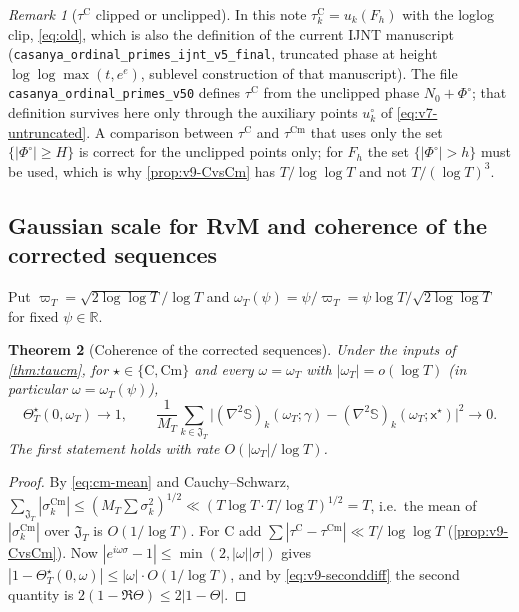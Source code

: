 \documentclass[11pt,a4paper]{article}
\numberwithin{equation}{section}
\newtheorem{theorem}{Theorem}[section]
\theoremstyle{definition}
\theoremstyle{remark}
\newtheorem{remark}[theorem]{Remark}
\newcommand{\Cm}{\mathrm{Cm}}
\begin{document}
\begin{remark}[$\tau^{\mathrm C}$ clipped or unclipped]\label{rem:v9-clip}
In this note $\tau_k^{\mathrm C}=u_k(F_h)$ with the loglog clip, \eqref{eq:old}, which is also the definition of the current IJNT manuscript (\texttt{casanya\_\allowbreak ordinal\_\allowbreak primes\_\allowbreak ijnt\_\allowbreak v5\_\allowbreak final}, truncated phase at height $\log\log\max(t,e^e)$, sublevel construction of that manuscript). The file \texttt{casanya\_ordinal\_primes\_v50} defines $\tau^{\mathrm C}$ from the unclipped phase $N_0+\Phi^\circ$; that definition survives here only through the auxiliary points $u_k^\circ$ of \eqref{eq:v7-untruncated}. A comparison between $\tau^{\mathrm C}$ and $\tau^{\Cm}$ that uses only the set $\{|\Phi^\circ|\ge H\}$ is correct for the unclipped points only; for $F_h$ the set $\{|\Phi^\circ|>h\}$ must be used, which is why \cref{prop:v9-CvsCm} has $T/\log\log T$ and not $T/(\log T)^3$.
\end{remark}

\subsection{Gaussian scale for RvM and coherence of the corrected sequences}\label{sec:v9-coherence}
Put $\varpi_T=\sqrt{2\log\log T}/\log T$ and $\omega_T(\psi)=\psi/\varpi_T=\psi\log T/\sqrt{2\log\log T}$ for fixed $\psi\in\mathbb R$.

\begin{theorem}[Coherence of the corrected sequences]\label{thm:v9-coherence}
Under the inputs of \cref{thm:taucm}, for $\star\in\{\mathrm C,\Cm\}$ and every $\omega=\omega_T$ with $|\omega_T|=o(\log T)$ (in particular $\omega=\omega_T(\psi)$),
\begin{equation}
\Theta_T^\star(0,\omega_T)\longrightarrow1,\qquad
\frac1{M_T}\sum_{k\in\mathfrak J_T}\bigl|(\nabla^2\mathbb S)_k(\omega_T;\gamma)-(\nabla^2\mathbb S)_k(\omega_T;\mathsf x^\star)\bigr|^2\longrightarrow0 .
\end{equation}
The first statement holds with rate $O(|\omega_T|/\log T)$.
\end{theorem}
\begin{proof}
By \eqref{eq:cm-mean} and Cauchy--Schwarz, $\sum_{\mathfrak J_T}|\sigma_k^{\Cm}|\le(M_T\sum\sigma_k^2)^{1/2}\ll(T\log T\cdot T/\log T)^{1/2}=T$, i.e.\ the mean of $|\sigma_k^{\Cm}|$ over $\mathfrak J_T$ is $O(1/\log T)$. For $\mathrm C$ add $\sum|\tau^{\mathrm C}-\tau^{\Cm}|\ll T/\log\log T$ (\cref{prop:v9-CvsCm}). Now $|e^{i\omega\sigma}-1|\le\min(2,|\omega||\sigma|)$ gives $|1-\Theta_T^\star(0,\omega)|\le|\omega|\cdot O(1/\log T)$, and by \eqref{eq:v9-seconddiff} the second quantity is $2(1-\Re\Theta)\le2|1-\Theta|$.
\end{proof}
\end{document}
